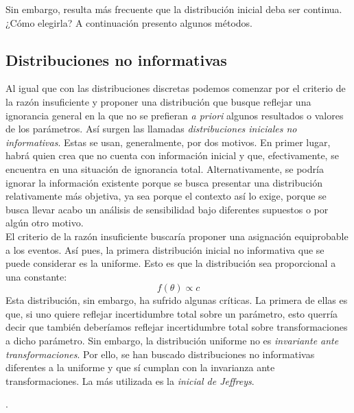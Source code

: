 Sin embargo, resulta más frecuente que la distribución inicial deba ser continua. ¿Cómo elegirla? A continuación presento algunos métodos.  

\subsection{Distribuciones no informativas}

Al igual que con las distribuciones discretas podemos comenzar por el criterio de la razón insuficiente y proponer una distribución que busque reflejar una ignorancia general en la que no se prefieran \textit{a priori} algunos resultados o valores de los parámetros. Así surgen las llamadas \textit{distribuciones iniciales no informativas}. Estas se usan, generalmente, por dos motivos. En primer lugar, habrá quien crea que no cuenta con información inicial y que, efectivamente, se encuentra en una situación de ignorancia total. Alternativamente, se podría ignorar la información existente porque se busca presentar una distribución relativamente más objetiva, ya sea porque el contexto así lo exige, porque se busca llevar acabo un análisis de sensibilidad bajo diferentes supuestos o por algún otro motivo.\\ 

El criterio de la razón insuficiente buscaría proponer una asignación equiprobable a los eventos. Así pues, la primera distribución inicial no informativa que se puede considerar es la uniforme. Esto es que la distribución sea proporcional a una constante:
\begin{equation*}
f(\theta) \propto c
\end{equation*}
Esta distribución, sin embargo, ha sufrido algunas críticas. La primera de ellas es que, si uno quiere reflejar incertidumbre total sobre un parámetro, esto querría decir que también deberíamos reflejar incertidumbre total sobre transformaciones a dicho parámetro. Sin embargo, la distribución uniforme no es \textit{invariante ante transformaciones}. Por ello, se han buscado distribuciones no informativas diferentes a la uniforme y que sí cumplan con la invarianza ante transformaciones. La más utilizada es la \textit{inicial de Jeffreys}. 

.\\ 

